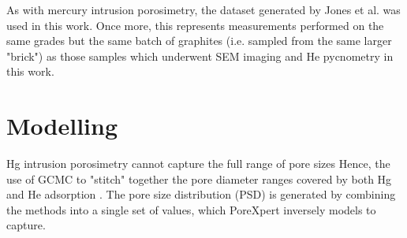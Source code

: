 \documentclass[3p,twocolumn]{elsarticle}
\begin{document}
As with mercury intrusion porosimetry, the dataset generated by Jones et al.
\citep{Jones2018} was used in this work. Once more, this represents
measurements performed on the same grades but the same
batch of graphites (i.e. sampled from the same larger "brick") as those samples which
underwent SEM imaging and He pycnometry in this work.

\section{Modelling}
Hg intrusion porosimetry cannot capture the full range of pore sizes
 Hence, the use of GCMC to "stitch" together the pore diameter
ranges covered by both Hg and He adsorption \citep{Jones2018}. The pore size distribution (PSD) is
generated by combining the methods into a single set of values, which PoreXpert
inversely models to capture. 

\clearpage


\end{document}
